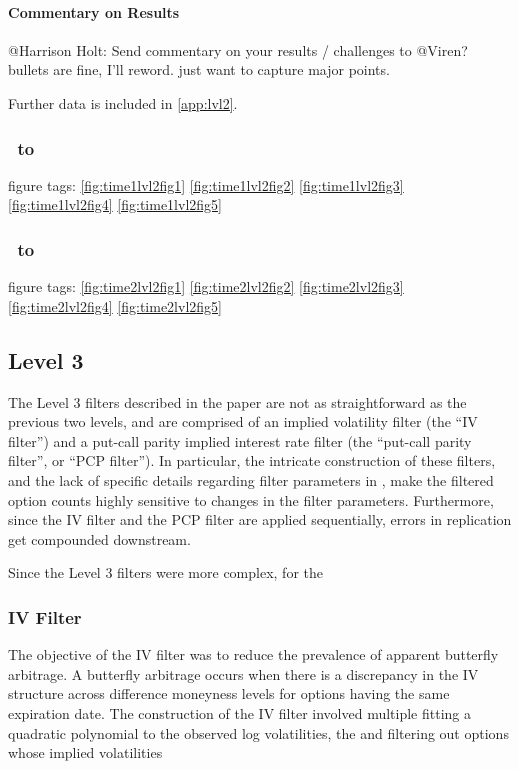 \paragraph{Commentary on Results}

@{Harrison Holt}: Send commentary on your results / challenges to @Viren? bullets are fine, I'll reword. just want to capture major points.

Further data is included in \autoref{app:lvl2}. 


\subsubsection{\STARTONE\ to \ENDONE }
figure tags: 
\autoref{fig:time1lvl2fig1}
\autoref{fig:time1lvl2fig2}
\autoref{fig:time1lvl2fig3}
\autoref{fig:time1lvl2fig4}
\autoref{fig:time1lvl2fig5}

\subsubsection{\STARTTWO\ to \ENDTWO }
figure tags: 
\autoref{fig:time2lvl2fig1}
\autoref{fig:time2lvl2fig2}
\autoref{fig:time2lvl2fig3}
\autoref{fig:time2lvl2fig4}
\autoref{fig:time2lvl2fig5}


\subsection{Level 3} 

The Level 3 filters described in the paper are not as straightforward as the previous two levels, and are comprised of an implied volatility filter (the ``IV filter'') and a put-call parity implied interest rate filter (the ``put-call parity filter'', or ``PCP filter''). In particular, the intricate construction of these filters, and the lack of specific details regarding filter parameters in \citet{constantinides2013}, make the filtered option counts highly sensitive to changes in the filter parameters. Furthermore, since the IV filter and the PCP filter are applied sequentially, errors in replication get compounded downstream. 

Since the Level 3 filters were more complex, for the 

\subsubsection{IV Filter}

The objective of the IV filter was to reduce the prevalence of apparent butterfly arbitrage. A butterfly arbitrage occurs when there is a discrepancy in the IV structure across difference moneyness levels for options having the same expiration date. The construction of the IV filter involved multiple fitting a quadratic polynomial to the observed log volatilities, the and filtering out options whose implied volatilities 


